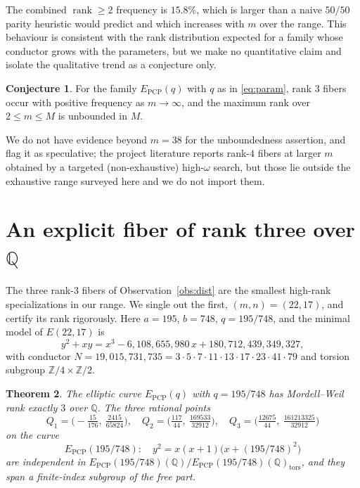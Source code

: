 \documentclass[11pt,reqno]{amsart}
\theoremstyle{plain}
\newtheorem{theorem}{Theorem}[section]
\theoremstyle{definition}
\newtheorem{conjecture}[theorem]{Conjecture}
\theoremstyle{remark}
\newcommand{\Q}{\mathbb{Q}}
\newcommand{\Z}{\mathbb{Z}}
\newcommand{\PCP}{E_{\mathrm{PCP}}}
\DeclareMathOperator{\rank}{rank}
\begin{document}
The combined $\rank\ge 2$ frequency is $15.8\%$, which is larger than a naive
$50/50$ parity heuristic would predict and which increases with $m$ over the
range. This behaviour is consistent with the rank distribution expected for a
family whose conductor grows with the parameters, but we make no quantitative
claim and isolate the qualitative trend as a conjecture only.

\begin{conjecture}\label{conj:rank}
For the family $\PCP(q)$ with $q$ as in \eqref{eq:param}, rank $3$ fibers occur
with positive frequency as $m\to\infty$, and the maximum rank over
$2\le m\le M$ is unbounded in $M$.
\end{conjecture}

We do not have evidence beyond $m=38$ for the unboundedness assertion, and
flag it as speculative; the project literature reports rank-$4$ fibers at larger
$m$ obtained by a targeted (non-exhaustive) high-$\omega$ search, but those lie
outside the exhaustive range surveyed here and we do not import them.

\section{An explicit fiber of rank three over \texorpdfstring{$\Q$}{Q}}\label{sec:rank3}

The three rank-$3$ fibers of Observation~\ref{obs:dist} are the smallest
high-rank specializations in our range. We single out the first,
$(m,n)=(22,17)$, and certify its rank rigorously. Here
$a=195$, $b=748$, $q=195/748$, and the minimal model of $E(22,17)$ is
\begin{equation}\label{eq:E2217}
  y^2 + xy = x^3 - 6{,}108{,}655{,}980\,x + 180{,}712{,}439{,}349{,}327,
\end{equation}
with conductor $N = 19{,}015{,}731{,}735 = 3\cdot5\cdot7\cdot11\cdot13\cdot17\cdot23\cdot41\cdot79$ and torsion subgroup $\Z/4\times\Z/2$.

\begin{theorem}\label{thm:main}
The elliptic curve $\PCP(q)$ with $q=195/748$ has Mordell--Weil rank exactly
$3$ over $\Q$. The three rational points
\[
  Q_1 = \Big(-\tfrac{15}{176},\ \tfrac{2415}{65824}\Big),\quad
  Q_2 = \Big(\tfrac{117}{44},\ \tfrac{169533}{32912}\Big),\quad
  Q_3 = \Big(\tfrac{12675}{44},\ \tfrac{161213325}{32912}\Big)
\]
on the curve
\[
  \PCP(195/748)\colon\quad y^2=x(x+1)\bigl(x+(195/748)^2\bigr)
\]
are independent in
$\PCP(195/748)(\Q)/\PCP(195/748)(\Q)_{\mathrm{tors}}$, and they span a
finite-index subgroup of the free part.
\end{theorem}
\end{document}
